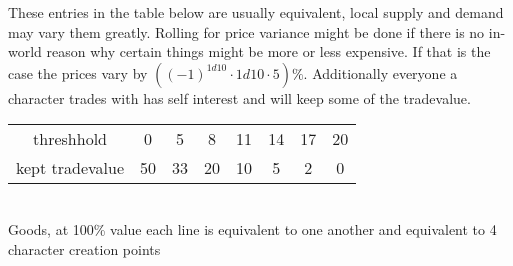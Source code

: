 These entries in the table below are usually equivalent, local supply and demand may vary them greatly.
Rolling for price variance might be done if there is no in-world reason why certain things might be more or
less expensive.
If that is the case the prices vary by \(((-1)^{1d10}\cdot1d10\cdot5) \%\).
Additionally everyone a character trades with has self interest and will keep some of
the tradevalue.\par
\begin{tabular}{cccccccc}
threshhold&0&5&8&11&14&17&20\\
kept tradevalue&50&33&20&10&5&2&0
\end{tabular}\\
Goods, at 100\% value each line is equivalent to one another and equivalent to 4 character creation points \par
